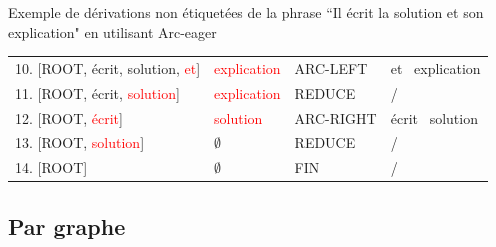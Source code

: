 \documentclass[xcolor=table]{beamer}
\begin{document}
\begin{frame}
\begin{exampleblock}{Exemple de dérivations non étiquetées de la phrase ``Il écrit la solution et son explication" en utilisant Arc-eager}
\begin{tabular}{llll}
		10. [ROOT, écrit, solution, \textcolor{red}{et}] & \textcolor{red}{explication} & ARC-LEFT & et \textleftarrow\ explication\\	
		11. [ROOT, écrit, \textcolor{red}{solution}] & \textcolor{red}{explication} & REDUCE & /\\
		12. [ROOT, \textcolor{red}{écrit}] & \textcolor{red}{solution} & ARC-RIGHT & écrit \textrightarrow\ solution\\
		13. [ROOT, \textcolor{red}{solution}] & $\emptyset$ & REDUCE & / \\
		14. [ROOT] & $\emptyset$ & FIN & / \\
	\end{tabular}
\end{exampleblock}

\end{frame}

\subsection{Par graphe}

%
%
%
\end{document}
